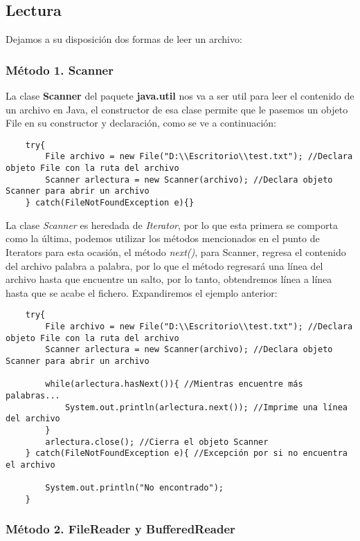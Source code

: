 \subsection{Lectura}
Dejamos a su disposición dos formas de leer un archivo:

\subsubsection{Método 1. Scanner}
La clase \textbf{Scanner} del paquete \textbf{java.util} nos va a ser util para leer el contenido de un archivo en Java, el constructor de esa clase permite que le pasemos un objeto File en su constructor y declaración, como se ve a continuación:
\begin{lstlisting}
    try{
        File archivo = new File("D:\\Escritorio\\test.txt"); //Declara objeto File con la ruta del archivo
        Scanner arlectura = new Scanner(archivo); //Declara objeto Scanner para abrir un archivo
    } catch(FileNotFoundException e){}
\end{lstlisting}
La clase \textit{Scanner} es heredada de \textit{Iterator}, por lo que esta primera se comporta como la última, podemos utilizar los métodos mencionados en el punto de Iterators para esta ocasión, el método \textit{next()}, para Scanner, regresa el contenido del archivo palabra a palabra, por lo que el método regresará una línea del archivo hasta que encuentre un salto, por lo tanto, obtendremos línea a línea hasta que se acabe el fichero. Expandiremos el ejemplo anterior:
\begin{lstlisting}
    try{
        File archivo = new File("D:\\Escritorio\\test.txt"); //Declara objeto File con la ruta del archivo
        Scanner arlectura = new Scanner(archivo); //Declara objeto Scanner para abrir un archivo
        
        while(arlectura.hasNext()){ //Mientras encuentre más palabras...
            System.out.println(arlectura.next()); //Imprime una línea del archivo
        }
        arlectura.close(); //Cierra el objeto Scanner
    } catch(FileNotFoundException e){ //Excepción por si no encuentra el archivo
    
        System.out.println("No encontrado");
    }
\end{lstlisting}

\subsubsection{Método 2. FileReader y BufferedReader}


